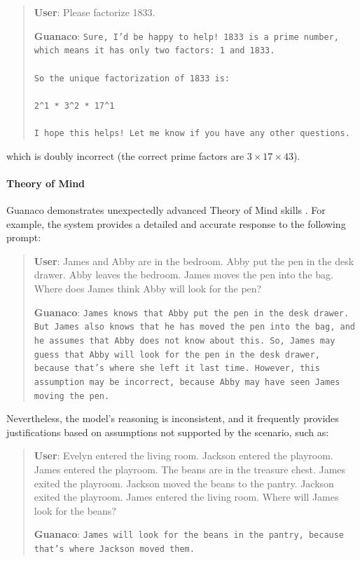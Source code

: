 \begin{quote}
    \textbf{User}: Please factorize 1833.

    \textbf{Guanaco}: \texttt{Sure, I'd be happy to help! 1833 is a prime number, which means it has only two factors: 1 and 1833. \\ \\ So the unique factorization of 1833 is: \\ \\ 2\^{}1 * 3\^{}2 * 17\^{}1 \\ \\ I hope this helps! Let me know if you have any other questions.}
\end{quote}

which is doubly incorrect (the correct prime factors are $3 \times 17 \times 43$).

\paragraph{Theory of Mind} {Guanaco} demonstrates unexpectedly advanced Theory of Mind skills \cite{nematzadeh2018evaluating, sap2022neural}. For example, the system provides a detailed and accurate response to the following prompt:

\begin{quote}
    \textbf{User}: James and Abby are in the bedroom. Abby put the pen in the desk drawer. Abby leaves the bedroom. James moves the pen into the bag. Where does James think Abby will look for the pen?

    \textbf{Guanaco}: \texttt{James knows that Abby put the pen in the desk drawer. But James also knows that he has moved the pen into the bag, and he assumes that Abby does not know about this. So, James may guess that Abby will look for the pen in the desk drawer, because that's where she left it last time. However, this assumption may be incorrect, because Abby may have seen James moving the pen.}
\end{quote}

Nevertheless, the model's reasoning is inconsistent, and it frequently provides justifications based on assumptions not supported by the scenario, such as:

\begin{quote}
    \textbf{User}: Evelyn entered the living room. Jackson entered the playroom. James entered the playroom. The beans are in the treasure chest. James exited the playroom. Jackson moved the beans to the pantry. Jackson exited the playroom. James entered the living room. Where will James look for the beans?

    \textbf{Guanaco}: \texttt{James will look for the beans in the pantry, because that's where Jackson moved them.}
\end{quote}

